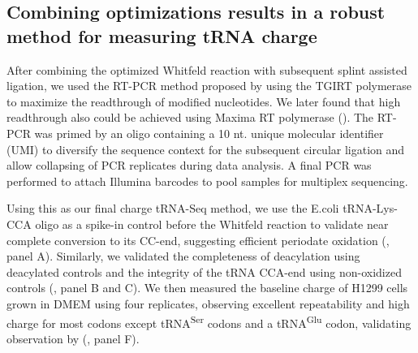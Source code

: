 \documentclass[9pt,lineno]{elife}
\begin{document}
\subsection{Combining optimizations results in a robust method for measuring tRNA charge}
After combining the optimized Whitfeld reaction with subsequent splint assisted ligation, we used the RT-PCR method proposed by \cite{Behrens2021-gb} using the TGIRT polymerase \citep{Mohr2013-hu} to maximize the readthrough of modified nucleotides.
We later found that high readthrough also could be achieved using Maxima RT polymerase ().
The RT-PCR was primed by an oligo containing a 10 nt. unique molecular identifier (UMI) to diversify the sequence context for the subsequent circular ligation and allow collapsing of PCR replicates during data analysis.
A final PCR was performed to attach Illumina barcodes to pool samples for multiplex sequencing.

Using this as our final charge tRNA-Seq method, we use the E.coli tRNA-Lys-CCA oligo as a spike-in control before the Whitfeld reaction to validate near complete conversion to its CC-end, suggesting efficient periodate oxidation (, panel A).
Similarly, we validated the completeness of deacylation using deacylated controls and the integrity of the tRNA CCA-end using non-oxidized controls (, panel B and C).
We then measured the baseline charge of H1299 cells grown in DMEM using four replicates, observing excellent repeatability and high charge for most codons except tRNA\textsuperscript{Ser} codons and a tRNA\textsuperscript{Glu} codon, validating observation by \cite{Evans2017-st} (, panel F).
\end{document}
